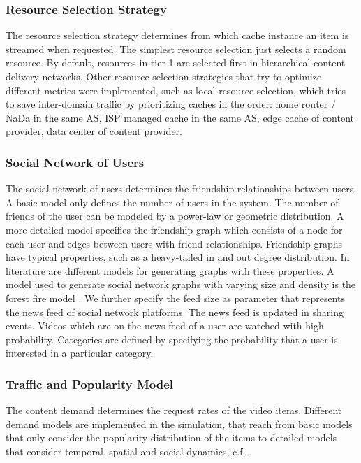 \subsubsection{Resource Selection Strategy}
The resource selection strategy determines from which cache instance an item is streamed when requested.
The simplest resource selection just selects a random resource.
By default, resources in tier-1 are selected first in hierarchical content delivery networks.
Other resource selection strategies that try to optimize different metrics were implemented, such as local resource selection, which tries to save inter-domain traffic by prioritizing caches in the order: home router / NaDa in the same AS, ISP managed cache in the same AS, edge cache of content provider, data center of content provider.

\subsubsection{Social Network of Users}
The social network of users determines the friendship relationships between users. A basic model only defines the number of users in the system.
The number of friends of the user can be modeled by a power-law or geometric distribution.
A more detailed model specifies the friendship graph which consists of a node for each user and edges between users with friend relationships.
Friendship graphs have typical properties, such as a heavy-tailed in and out degree distribution.
In literature are different models for generating graphs with these properties.
A model used to generate social network graphs with varying size and density is the forest fire model \cite{leskovec2005graphs}.
We further specify the feed size as parameter that represents the news feed of social network platforms.
The news feed is updated in sharing events.
Videos which are on the news feed of a user are watched with high probability.
Categories are defined by specifying the probability that a user is interested in a particular category.

\subsubsection{Traffic and Popularity Model}
The content demand determines the request rates of the video items.
Different demand models are implemented in the simulation, that reach from basic models that only consider the popularity distribution of the items to detailed models that consider temporal, spatial and social dynamics, c.f. .

